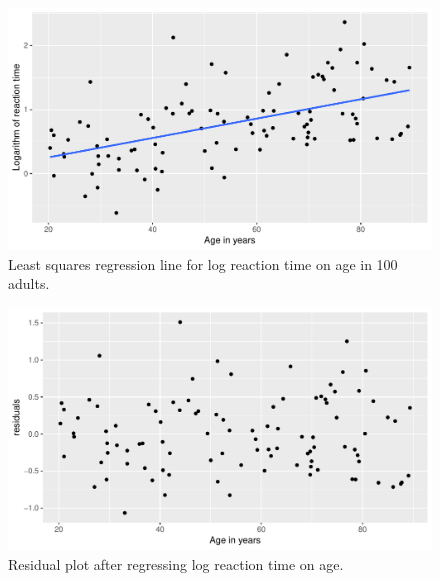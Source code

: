 \documentclass[]{book}\usepackage[]{graphicx}\usepackage[]{color}
\makeatletter
\def\maxwidth{ %
  \ifdim\Gin@nat@width>\linewidth
    \linewidth
  \else
    \Gin@nat@width
  \fi
}
\newenvironment{knitrout}{}{} %
\makeatother
\begin{document}
\begin{knitrout}
\color{fgcolor}\begin{figure}

{\centering \includegraphics[width=\maxwidth]{figure/ass_18-1} 

}

\caption[Least squares regression line for log reaction time on age in 100 adults]{Least squares regression line for log reaction time on age in 100 adults.}\label{fig:ass_18}
\end{figure}


\end{knitrout}

\begin{knitrout}
\color{fgcolor}\begin{figure}

{\centering \includegraphics[width=\maxwidth]{figure/ass_19-1} 

}

\caption[Residual plot after regressing log reaction time on age]{Residual plot after regressing log reaction time on age.}\label{fig:ass_19}
\end{figure}


\end{knitrout}
\end{document}
